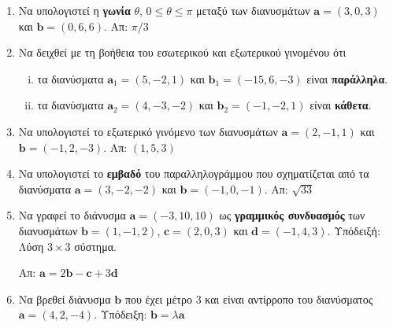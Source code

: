 


\pagestyle{askhseis}
\geometry{top=2.7cm}

\renewcommand{\vec}{\mathbf}



\begin{center}
  \minibox{\large \bfseries \textcolor{Col1}{Ασκήσεις στα Διανύσματα}}
\end{center}

\vspace{\baselineskip}

\begin{enumerate}[itemsep=0.7\baselineskip]

  \item Να υπολογιστεί η \textbf{γωνία} $ \theta $, $ 0\leq \theta \leq \pi $ μεταξύ των 
    διανυσμάτων $ \vec{a} = (3,0,3) $ και $ \vec{b} = (0,6,6) $.
    \hfill Απ: $ \pi/{3} $

  \item Να δειχθεί με τη βοήθεια του εσωτερικού και εξωτερικού γινομένου ότι
    \begin{enumerate}[i)]
      \item τα διανύσματα $ \vec{a}_1 = (5,-2,1) $ και $ \vec{b}_1 = (-15,6,-3) $ είναι 
        \textbf{παράλληλα}.
      \item τα διανύσματα $ \vec{a}_2 = (4,-3,-2) $ και $ \vec{b}_2 = (-1,-2,1) $ είναι 
        \textbf{κάθετα}.
    \end{enumerate}

  \item Να υπολογιστεί το εξωτερικό γινόμενο των διανυσμάτων 
    $ \vec{a} = (2,-1,1) $ και $ \vec{b} = (-1,2,-3) $.
    \hfill Απ: $ (1,5,3) $

  \item Να υπολογιστεί το \textbf{εμβαδό} του παραλληλογράμμου που σχηματίζεται από τα 
    διανύσματα $ \vec{a} = (3,-2,-2) $ και $ \vec{b} = (-1,0,-1) $.
    \hfill Απ: $ \sqrt{33} $ 

  \item Να γραφεί το διάνυσμα $ \vec{a}=(-3,10,10) $ ως \textbf{γραμμικός συνδυασμός} 
    των διανυσμάτων $\vec{b}=(1,-1,2)$, $ \vec{c}=(2,0,3) $ και $ \vec{d}=(-1,4,3) $.  
    \hfill Υπόδειξή: Λύση $ 3\times 3 $ σύστημα. 

    \hfill Απ: $ \vec{a}=2\vec{b}-\vec{c}+3\vec{d} $

  \item Να βρεθεί διάνυσμα $ \vec{b} $ που έχει μέτρο $3$ και είναι αντίρροπο του 
    διανύσματος $ \vec{a}=(4,2,-4)$.
    \hfill Υπόδειξη: $ \vec{b} = \lambda \vec{a} $		


\end{enumerate}
